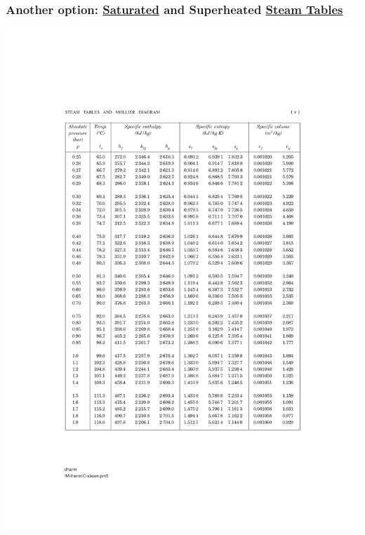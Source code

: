 \documentclass[10pt,compress,handout,ignorenonframetext]{beamer}
\begin{document}
\begin{frame}
  \frametitle{Another option: \underline{Saturated} and Superheated \underline{Steam Tables}}
     \vspace{-2.4cm}
     \begin{center}
        \includegraphics[width=10.cm,height=12.cm,clip]{./Pics/Sample_SteamTablePg}
     \end{center}
\end{frame}
\end{document}
